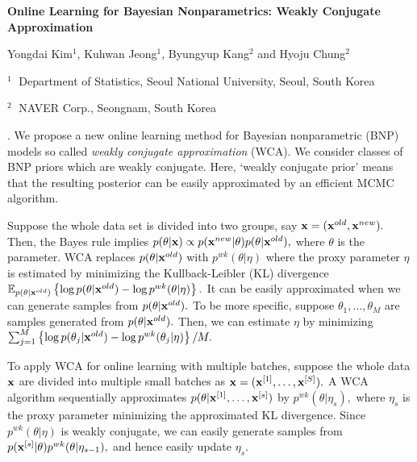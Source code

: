 \documentclass[12pt]{article}
\newcommand{\bx}{{\bf x}}
\newcommand{\E}{\mathbb{E}}
\begin{document}
\begin{flushleft}


{\LARGE\bf Online Learning for Bayesian Nonparametrics: Weakly Conjugate Approximation}


\vspace{1.0cm}

Yongdai Kim$^1$, Kuhwan Jeong$^1$, Byungyup Kang$^2$ and Hyoju Chung$^2$

\begin{description}

\item $^1 \;$ Department of Statistics, Seoul National University,
Seoul, South Korea

\item $^2 \;$ NAVER Corp.,
Seongnam, South Korea

\end{description}

\end{flushleft}


\vspace{0.75cm}

.
We propose a new online learning method for Bayesian nonparametric (BNP) models so called {\it weakly conjugate approximation} (WCA).
We consider classes of BNP priors which are weakly conjugate. Here, `weakly conjugate prior' means that the resulting posterior can be easily approximated by an efficient MCMC algorithm. 

Suppose the whole data set is divided
into two groups, say $\bx=(\bx^{old},\bx^{new}).$ Then, the Bayes rule implies
$p(\theta|\bx) \propto p(\bx^{new}|\theta) p(\theta|\bx^{old}),$
where $\theta$ is the parameter. WCA replaces $p(\theta|\bx^{old})$ with $p^{wk}(\theta|\eta)$ where
the proxy parameter $\eta$ is estimated by minimizing the Kullback-Leibler (KL) divergence
$\E_{p(\theta|\bx^{old})}\left\{ \log p(\theta|\bx^{old}) - \log p^{wk}(\theta|\eta)\right\}.$
It can be easily approximated when we can generate samples from $p(\theta|\bx^{old}).$ 
To be more specific, suppose $\theta_1,\ldots,\theta_M$ are samples generated from $p(\theta|\bx^{old}).$ Then, we can estimate $\eta$ by minimizing
$\sum_{j=1}^M\left\{ \log p(\theta_j|\bx^{old}) - \log p^{wk}(\theta_j|\eta)\right\}/M.$

To apply WCA for online learning with multiple batches, suppose the whole data $\bx$ are divided into multiple small batches as $\bx=(\bx^{[1]},\ldots,\bx^{[S]}).$ A WCA algorithm sequentially approximates $p(\theta|\bx^{[1]},\ldots,\bx^{[s]})$ by $p^{wk}(\theta|\eta_s),$ where
$\eta_s$ is the proxy parameter minimizing the approximated KL divergence.
Since $p^{wk}(\theta|\eta)$ is weakly conjugate, we can easily generate
samples from $p(\bx^{[s]}|\theta)p^{wk}(\theta|\eta_{s-1}),$ and hence easily update $\eta_s.$
\end{document}
